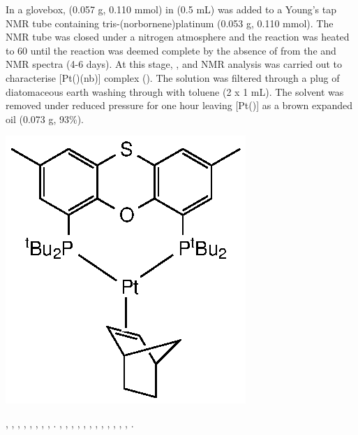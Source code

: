 In a glovebox, \tBuThixantphos{} (0.057 g, 0.110 mmol) in  (0.5 mL) was added to a Young's tap NMR tube containing tris-(norbornene)platinum (0.053 g, 0.110 mmol).  The NMR tube was closed under a nitrogen atmosphere and the reaction was heated to 60 \degC{} until the reaction was deemed complete by the absence of \tBuThixantphos{} from the \phosphorus{} and \proton{} NMR spectra (4-6 days).  At this stage, \proton{}, \carbon{} and \phosphorus{} NMR analysis was carried out to characterise [Pt(\tButhixantphos)(nb)] complex ().  The solution was filtered through a plug of diatomaceous earth washing through with toluene (2 x 1 mL).  The solvent was removed under reduced pressure for one hour leaving [Pt(\tButhixantphos)] as a brown expanded oil (0.073 g, 93\%).

\begin{structure}[h]
\begin{center}
\includegraphics{../Structures/StBuPlatinumnorbornene.eps}
\end{center}
\end{structure}

,
,
,
,
,
,
,
,
.
,
,
,
,
,
,
,
,
,
,
,
,
.

